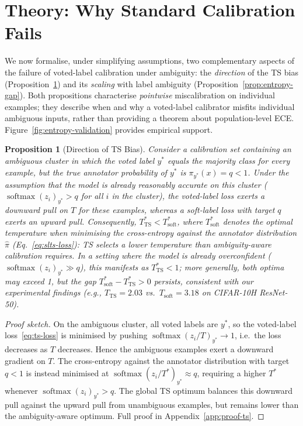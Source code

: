 \documentclass[10pt,journal,compsoc]{IEEEtran}
\newcommand{\pihat}{\hat{\pi}}
\newtheorem{proposition}{Proposition}
\begin{document}
\section{Theory: Why Standard Calibration Fails}
\label{sec:theory}

We now formalise, under simplifying assumptions, two complementary aspects of the failure of voted-label calibration under ambiguity: the \emph{direction} of the TS bias (Proposition~\ref{prop:ts-bias}) and its \emph{scaling} with label ambiguity (Proposition~\ref{prop:entropy-gap}).  Both propositions characterise \emph{pointwise} miscalibration on individual examples; they describe when and why a voted-label calibrator misfits individual ambiguous inputs, rather than providing a theorem about population-level ECE.  Figure~\ref{fig:entropy-validation} provides empirical support.

\begin{proposition}[Direction of TS Bias]
\label{prop:ts-bias}
Consider a calibration set containing an ambiguous cluster in which the voted label $y^*$ equals the majority class for every example, but the true annotator probability of $y^*$ is $\pi_{y^*}(x)=q < 1$.  Under the assumption that the model is already reasonably accurate on this cluster ($\operatorname{softmax}(z_i)_{y^*}>q$ for all $i$ in the cluster), the voted-label loss exerts a downward pull on $T$ for these examples, whereas a soft-label loss with target $q$ exerts an upward pull.  Consequently, $T^*_{\text{TS}} < T^*_{\text{soft}}$, where $T^*_{\text{soft}}$ denotes the optimal temperature when minimising the cross-entropy against the annotator distribution $\pihat$ (Eq.~\ref{eq:slts-loss}): TS selects a lower temperature than ambiguity-aware calibration requires.  In a setting where the model is already overconfident ($\operatorname{softmax}(z_i)_{y^*} \gg q$), this manifests as $T^*_{\text{TS}}<1$; more generally, both optima may exceed 1, but the gap $T^*_{\text{soft}} - T^*_{\text{TS}} > 0$ persists, consistent with our experimental findings (e.g., $T_{\text{TS}}=2.03$ vs.\ $T_{\text{soft}}=3.18$ on CIFAR-10H ResNet-50).
\end{proposition}

\begin{proof}[Proof sketch]
On the ambiguous cluster, all voted labels are $y^*$, so the voted-label loss~\eqref{eq:ts-loss} is minimised by pushing $\operatorname{softmax}(z_i/T)_{y^*}\to 1$, i.e.\ the loss decreases as $T$ decreases.  Hence the ambiguous examples exert a downward gradient on $T$.  The cross-entropy against the annotator distribution with target $q<1$ is instead minimised at $\operatorname{softmax}(z_i/T^*)_{y^*}\approx q$, requiring a higher $T^*$ whenever $\operatorname{softmax}(z_i)_{y^*}>q$.  The global TS optimum balances this downward pull against the upward pull from unambiguous examples, but remains lower than the ambiguity-aware optimum.  Full proof in Appendix~\ref{app:proof-ts}.
\end{proof}
\end{document}
